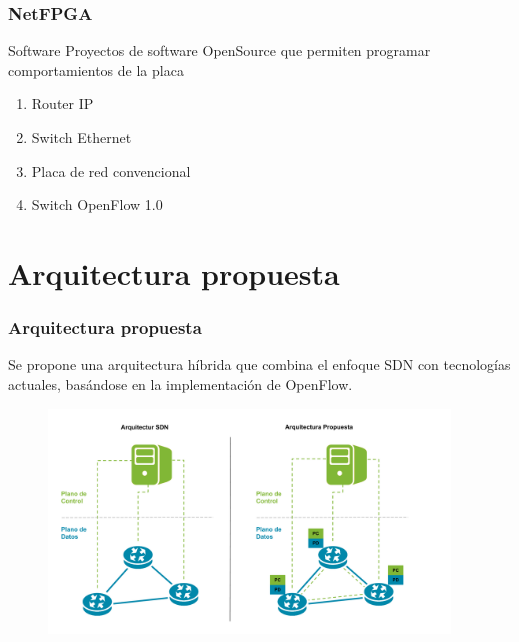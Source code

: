 \documentclass{beamer}
\begin{document}
\begin{frame}
\frametitle{NetFPGA} 
\begin{block}{Software}
Proyectos de software OpenSource que permiten programar comportamientos de la placa

\begin{enumerate}
\item Router IP
\item Switch Ethernet
\item Placa de red convencional
\item Switch OpenFlow 1.0
\end{enumerate}

\end{block}

\end{frame}







\section{Arquitectura propuesta} 


\begin{frame}
\frametitle{Arquitectura propuesta} 

Se propone una arquitectura h\'ibrida que combina el enfoque SDN con tecnologías actuales, basándose 
en la implementaci\'on de OpenFlow.

\begin{figure}[H]
\centering
\includegraphics[width=0.95\textwidth, left]{imagenes/arquitecturapropuesta.png}
\end{figure}

\end{frame}
\end{document}
